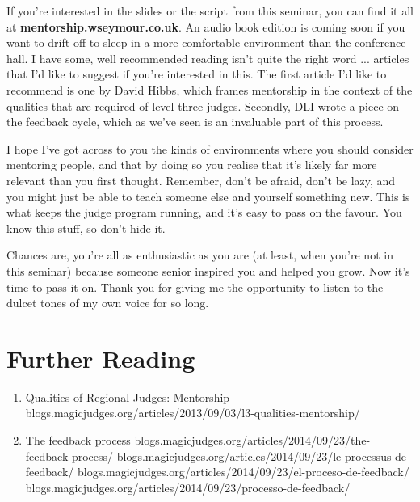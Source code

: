 \documentclass[10pt,a4paper]{article}
\begin{document}
If you're interested in the slides or the script from this seminar, you can find it all at \textbf{mentorship.wseymour.co.uk}. An audio book edition is coming soon if you want to drift off to sleep in a more comfortable environment than the conference hall. I have some, well recommended reading isn't quite the right word ... articles that I'd like to suggest if you're interested in this. The first article I'd like to recommend is one by David Hibbs, which frames mentorship in the context of the qualities that are required of level three judges. Secondly, DLI wrote a piece on the feedback cycle, which as we've seen is an invaluable part of this process.

I hope I've got across to you the kinds of environments where you should consider mentoring people, and that by doing so you realise that it's likely far more relevant than you first thought. Remember, don't be afraid, don't be lazy, and you might just be able to teach someone else and yourself something new. This is what keeps the judge program running, and it's easy to pass on the favour. You know this stuff, so don't hide it.

Chances are, you're all as enthusiastic as you are (at least, when you're not in this seminar) because someone senior inspired you and helped you grow. Now it's time to pass it on. Thank you for giving me the opportunity to listen to the dulcet tones of my own voice for so long.

\section{Further Reading}
\begin{enumerate}
	\item Qualities of Regional Judges: Mentorship 
	\subitem [EN] blogs.magicjudges.org/articles/2013/09/03/l3-qualities-mentorship/
	
	\item The feedback process
	\subitem [EN] blogs.magicjudges.org/articles/2014/09/23/the-feedback-process/
	\subitem [FR] blogs.magicjudges.org/articles/2014/09/23/le-processus-de-feedback/
	\subitem [ES] blogs.magicjudges.org/articles/2014/09/23/el-proceso-de-feedback/
	\subitem [PT] blogs.magicjudges.org/articles/2014/09/23/processo-de-feedback/
\end{enumerate}
\end{document}
